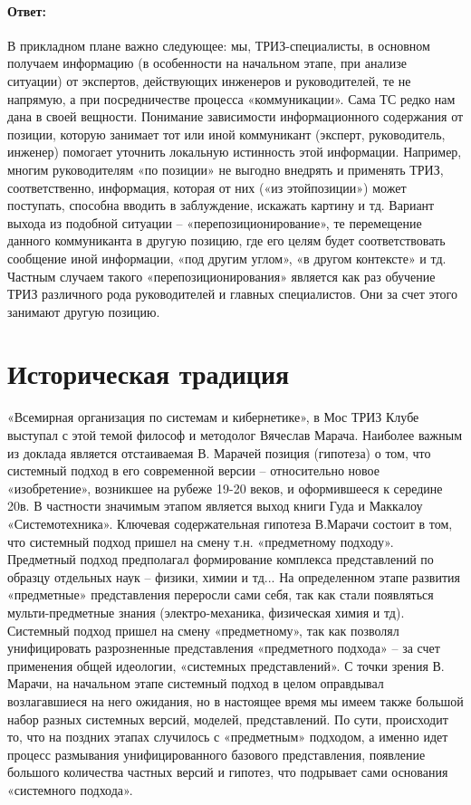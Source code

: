 \documentclass[11pt,a4paper]{article}
\begin{document}
\paragraph{Ответ:}
В прикладном плане важно следующее: мы, ТРИЗ-специалисты, в основном получаем
информацию (в особенности на начальном этапе, при анализе ситуации) от
экспертов, действующих инженеров и руководителей, те не напрямую, а при
посредничестве процесса «коммуникации». Сама ТС редко нам дана в своей
вещности.  Понимание зависимости информационного содержания от позиции,
которую занимает тот или иной коммуникант (эксперт, руководитель, инженер)
помогает уточнить локальную истинность этой информации. Например, многим
руководителям «по позиции» не выгодно внедрять и применять ТРИЗ,
соответственно, информация, которая от них («из этойпозиции») может поступать,
способна вводить в заблуждение, искажать картину и тд.  Вариант выхода из
подобной ситуации – «перепозиционирование», те перемещение данного
коммуниканта в другую позицию, где его целям будет соответствовать сообщение
иной информации, «под другим углом», «в другом контексте» и тд. Частным
случаем такого «перепозиционирования» является как раз обучение ТРИЗ
различного рода руководителей и главных специалистов. Они за счет этого
занимают другую позицию.

\section{Историческая традиция}
«Всемирная организация по системам и кибернетике», в Мос ТРИЗ Клубе выступал с
этой темой философ и методолог Вячеслав Марача. Наиболее важным из доклада
является отстаиваемая В. Марачей позиция (гипотеза) о том, что системный
подход в его современной версии – относительно новое «изобретение», возникшее
на рубеже 19-20 веков, и оформившееся к середине 20в. В частности значимым
этапом является выход книги Гуда и Маккалоу «Системотехника». Ключевая
содержательная гипотеза В.Марачи состоит в том, что системный подход пришел на
смену т.н. «предметному подходу».  Предметный подход предполагал формирование
комплекса представлений по образцу отдельных наук – физики, химии и тд... На
определенном этапе развития «предметные» представления переросли сами себя,
так как стали появляться мульти-предметные знания (электро-механика,
физическая химия и тд). Системный подход пришел на смену «предметному», так
как позволял унифицировать разрозненные представления «предметного подхода» --
за счет применения общей идеологии, «системных представлений». С точки зрения
В. Марачи, на начальном этапе системный подход в целом оправдывал возлагавшиеся
на него ожидания, но в настоящее время мы имеем также большой набор разных
системных версий, моделей, представлений. По сути, происходит то, что на
поздних этапах случилось с «предметным» подходом, а именно идет процесс
размывания унифицированного базового представления, появление большого
количества частных версий и гипотез, что подрывает сами основания «системного
подхода».
\end{document}
